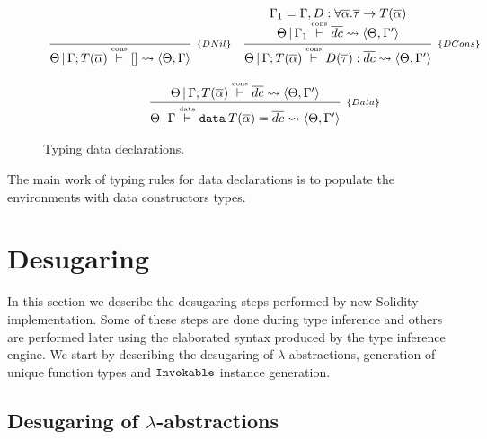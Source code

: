 \documentclass[a4paper, 11pt]{article}
\theoremstyle{definition}
\begin{document}
\begin{figure}[H]
  \[
    \begin{array}{cc}
      \infer[_{\{DNil\}}]
            {\Theta\,|\,\Gamma ; T(\overline{\alpha})\typing{cons} [] \leadsto \langle \Theta, \Gamma \rangle}
            {}
      &
      \infer[_{\{DCons\}}]
            {\Theta\,|\,\Gamma ; T(\overline{\alpha}) \typing{cons} D(\overline{\tau}) : \overline{dc}\leadsto \langle \Theta, \Gamma' \rangle }
            {\begin{array}{c}
              \Gamma_1 = \Gamma, D : \forall \overline{\alpha} . \overline{\tau} \to T(\overline{\alpha})\\
              \Theta\,|\,\Gamma_1 \typing{cons} \overline{dc} \leadsto \langle \Theta, \Gamma' \rangle
             \end{array}}
      \\ \\
      \multicolumn{2}{c}{
        \infer[_{\{Data\}}]
              {\Theta\,|\,\Gamma \typing{data} \mathtt{data}\:T(\overline{\alpha}) = \overline{dc} \leadsto \langle \Theta, \Gamma' \rangle}
              {\Theta\,|\,\Gamma ; T(\overline{\alpha})\typing{cons} \overline{dc} \leadsto \langle \Theta, \Gamma' \rangle}
      }
    \end{array}
  \]
  \centering
  \caption{Typing data declarations.}
  \label{fig:datatyping}
\end{figure}

The main work of typing rules for data declarations is to populate the
environments with data constructors types.


\section{Desugaring}\label{sec:desugar}

In this section we describe the desugaring steps performed by new
Solidity implementation. Some of these steps are done during type inference
and others are performed later using the elaborated syntax produced by
the type inference engine. We start by describing the desugaring
of $\lambda$-abstractions, generation of unique function types and
$\mathtt{Invokable}$ instance generation.

\subsection{Desugaring of $\lambda$-abstractions}
\end{document}
